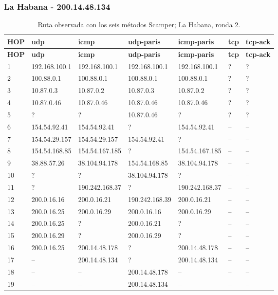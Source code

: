 \subsubsection{La Habana - 200.14.48.134}
\begingroup
\fontsize{8}{10}\selectfont
\begin{longtable}{p{0.8cm}p{2.25cm}p{2.25cm}p{2.25cm}p{2.25cm}p{2.25cm}p{2.25cm}}
\caption{Ruta observada con los seis métodos Scamper; La Habana, ronda 2.}\label{tabla1:200.14.48.134} \\
\toprule
\textbf{HOP} & \textbf{udp} & \textbf{icmp} & \textbf{udp-paris} & \textbf{icmp-paris} & \textbf{tcp} & \textbf{tcp-ack} \\ \midrule
\endfirsthead
\toprule
\textbf{HOP} & \textbf{udp} & \textbf{icmp} & \textbf{udp-paris} & \textbf{icmp-paris} & \textbf{tcp} & \textbf{tcp-ack} \\ \midrule
\endhead
1 & 192.168.100.1 & 192.168.100.1 & 192.168.100.1 & 192.168.100.1 & ? & ? \\
2 & 100.88.0.1 & 100.88.0.1 & 100.88.0.1 & 100.88.0.1 & ? & ? \\
3 & 10.87.0.3 & 10.87.0.2 & 10.87.0.3 & 10.87.0.2 & ? & ? \\
4 & 10.87.0.46 & 10.87.0.46 & 10.87.0.46 & 10.87.0.46 & ? & ? \\
5 & ? & ? & 10.87.0.46 & ? & ? & ? \\
6 & 154.54.92.41 & 154.54.92.41 & ? & 154.54.92.41 & -- & -- \\
7 & 154.54.29.157 & 154.54.29.157 & 154.54.92.41 & ? & -- & -- \\
8 & 154.54.168.85 & 154.54.167.185 & ? & 154.54.167.185 & -- & -- \\
9 & 38.88.57.26 & 38.104.94.178 & 154.54.168.85 & 38.104.94.178 & -- & -- \\
10 & ? & ? & 38.104.94.178 & ? & -- & -- \\
11 & ? & 190.242.168.37 & ? & 190.242.168.37 & -- & -- \\
12 & 200.0.16.16 & 200.0.16.21 & 190.242.168.39 & 200.0.16.21 & -- & -- \\
13 & 200.0.16.25 & 200.0.16.29 & 200.0.16.16 & 200.0.16.29 & -- & -- \\
14 & 200.0.16.25 & ? & 200.0.16.21 & ? & -- & -- \\
15 & 200.0.16.29 & ? & 200.0.16.29 & ? & -- & -- \\
16 & 200.0.16.25 & 200.14.48.178 & ? & 200.14.48.178 & -- & -- \\
17 & -- & 200.14.48.134 & ? & 200.14.48.134 & -- & -- \\
18 & -- & -- & 200.14.48.178 & -- & -- & -- \\
19 & -- & -- & 200.14.48.134 & -- & -- & -- \\
\bottomrule
\end{longtable}
\endgroup


